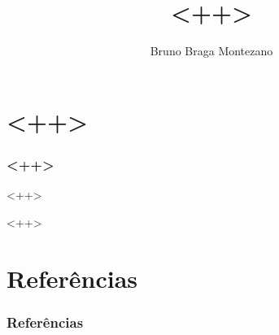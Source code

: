 \documentclass{beamer}
\title{<++>}
\author{Bruno Braga Montezano}
\institute{<++>}
\begin{document}
\ttfamily
\begin{frame}

\maketitle

\end{frame}

\section{<++>}

\begin{frame}
\frametitle{<++>}

<++>

\end{frame}

<++>

\section{Referências}

\begin{frame}
\frametitle{Referências}
\printbibliography
\end{frame}
\end{document}
